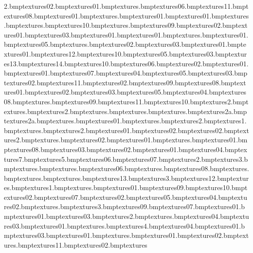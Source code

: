 \fence2.bmp textures\chubcons02.bmp textures\chubcons01.bmp textures\mub.bmp textures\chblock06.bmp textures\chblock11.bmp textures\chblock08.bmp textures\chblock01.bmp textures\ground.bmp textures\citycheesewire01.bmp textures\chubtunnel01.bmp textures\barrier.bmp textures\citytarmac.bmp textures\chubglad10.bmp textures\lobbycarpet.bmp textures\chubglad09.bmp textures\chubglad02.bmp textures\chubmus01.bmp textures\citybloom03.bmp textures\citybloom01.bmp textures\chubcarpark01.bmp textures\lobbycarpetcol.bmp textures\citypave01.bmp textures\chubgreen05.bmp textures\chubred.bmp textures\chubsafe02.bmp textures\chubsafe03.bmp textures\chubsafe01.bmp textures\winstar01.bmp textures\chblock12.bmp textures\chblock10.bmp textures\chblock05.bmp textures\chblock03.bmp textures\chblock13.bmp textures\chblock14.bmp textures\chubice10.bmp textures\chubice06.bmp textures\wineon02.bmp textures\market01.bmp textures\chubice01.bmp textures\chubice07.bmp textures\chubice04.bmp textures\chubice05.bmp textures\chubice03.bmp textures\chubice02.bmp textures\chubice11.bmp textures\barsblue02.bmp textures\chubice09.bmp textures\chubice08.bmp textures\chubgreen01.bmp textures\chubwin02.bmp textures\chubwin03.bmp textures\chubwin05.bmp textures\chubwin04.bmp textures\chubgreen08.bmp textures\cratesteel.bmp textures\chubcons09.bmp textures\chubcons11.bmp textures\chubcons10.bmp textures\gurder2.bmp textures\gurder.bmp textures\gurderend2.bmp textures\gurderend.bmp textures\greyconcrete.bmp textures\gurdera.bmp textures\gurder2a.bmp textures\gurderend2a.bmp textures\banner.bmp textures\deptlight01.bmp textures\pillardoor.bmp textures\pillardoor2.bmp textures\pillar1.bmp textures\marbwall.bmp textures\pillar2.bmp textures\ctblue01.bmp textures\ctblue02.bmp textures\pillargold02.bmp textures\window2.bmp textures\marbwallbord.bmp textures\market02.bmp textures\chubdept01.bmp textures\martmat.bmp textures\wineon01.bmp textures\ceramictile08.bmp textures\chubdept03.bmp textures\chubdept02.bmp textures\glass01.bmp textures\chubdept04.bmp textures\citytarmac7.bmp textures\citytarmac5.bmp textures\chubcons06.bmp textures\chubcons07.bmp textures\citytarmac2.bmp textures\citytarmac3.bmp textures\door.bmp textures\showlights.bmp textures\chubglad06.bmp textures\tablestand.bmp textures\chubglad08.bmp textures\gdoors.bmp textures\ticketoffice.bmp textures\chrome.bmp textures\chubglad13.bmp textures\aquasandcas3.bmp textures\chubglad12.bmp textures\carpetredstar.bmp textures\carpetred1.bmp textures\entryblue.bmp textures\chubyellow01.bmp textures\chubgreen09.bmp textures\chubgreen10.bmp textures\chubgreen02.bmp textures\chubgreen07.bmp textures\chubflannel02.bmp textures\chubsafe05.bmp textures\chblock04.bmp textures\chblock02.bmp textures\cardbox.bmp textures\cardbox3.bmp textures\chblock09.bmp textures\chblock07.bmp textures\glassblue01.bmp textures\chubflannel01.bmp textures\leading03.bmp textures\trunkend2.bmp textures\fencewood.bmp textures\chubgreen04.bmp textures\chubgreen03.bmp textures\chubmarv01.bmp textures\samtea.bmp textures\bridgesnow4.bmp textures\chubsafe04.bmp textures\signtaxi01.bmp textures\signsports03.bmp textures\chubwin01.bmp textures\signcereal.bmp textures\chubneon01.bmp textures\chubmarv02.bmp textures\chubshop.bmp textures\chubgreen11.bmp textures\samcerealbox02.bmp textures\samcerealbox